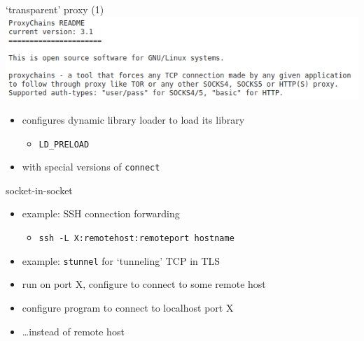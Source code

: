 
\begin{frame}[fragile]{`transparent' proxy (1)}
\includegraphics[width=\textwidth]{../encap/proxy-chains}
\begin{itemize}
\item configures dynamic library loader to load its library
    \begin{itemize}
    \item \texttt{LD\_PRELOAD}
    \end{itemize}
\item with special versions of \texttt{connect}
\end{itemize}
\end{frame}


\begin{frame}{socket-in-socket}
    \begin{itemize}
    \item example: SSH connection forwarding
        \begin{itemize}
        \item \texttt{ssh -L X:remotehost:remoteport hostname}
        \end{itemize}
    \item example: \texttt{stunnel} for `tunneling' TCP in TLS
    \item run on port X, configure to connect to some remote host
    \item configure program to connect to localhost port X
    \item \ldots instead of remote host
    \end{itemize}
\end{frame}


